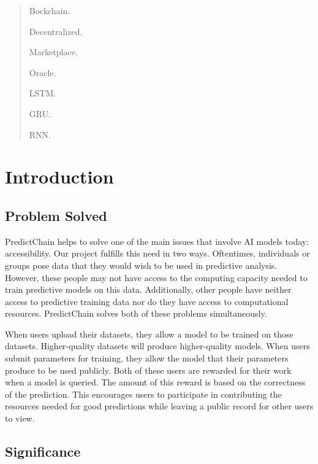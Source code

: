 \documentclass{ledger}
\begin{document}
\begin{abstract}
\begin{keywords}
\item Bockchain.
\item Decentralized.
\item Marketplace.
\item Oracle.
\item LSTM.
\item GRU.
\item RNN.
\end{keywords}
\end{abstract}

\pagebreak

\section{Introduction}

\subsection{Problem Solved}

PredictChain helps to solve one of the main issues that involve AI models today: accessibility.  Our project fulfills this
need in two ways.  Oftentimes, individuals or groups pose data that they would wish to be used in predictive analysis.
However, these people may not have access to the computing capacity needed to train predictive models on this data.
Additionally, other people have neither access to predictive training data nor do they have access to computational
resources.  PredictChain solves both of these problems simultaneously.

When users upload their datasets, they allow a model to be trained on those datasets.  Higher-quality datasets will produce
higher-quality models.  When users submit parameters for training, they allow the model that their parameters produce to
be used publicly.  Both of these users are rewarded for their work when a model is queried.  The amount of this reward
is based on the correctness of the prediction.  This encourages users to participate in contributing the
resources needed for good predictions while leaving a public record for other users to view.

\subsection{Significance}
\end{document}
